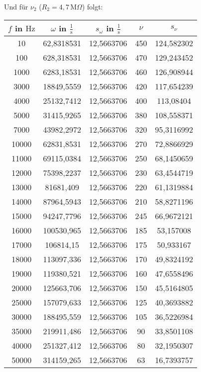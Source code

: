 Und für $\nu_2$ ($R_2=4,7\,\text{M}\Omega$) folgt:
\begin{table}[htbp]
    \centering
      \begin{tabular}{c||c|c|c|c}
      $f$ in $\text{Hz}$ & $\omega$ in $\frac{1}{\text{s}}$ & $s_\omega$ in $\frac{1}{\text{s}}$ & $\nu$ & $s_\nu$ \\
      \hline
      10 & 62,8318531 & 12,5663706 & 450 & 124,582302 \\
      100 & 628,318531 & 12,5663706 & 470 & 129,243452 \\
      1000 & 6283,18531 & 12,5663706 & 460 & 126,908944 \\
      3000 & 18849,5559 & 12,5663706 & 420 & 117,654239 \\
      4000 & 25132,7412 & 12,5663706 & 400 & 113,08404 \\
      5000 & 31415,9265 & 12,5663706 & 380 & 108,558371 \\
      7000 & 43982,2972 & 12,5663706 & 320 & 95,3116992 \\
      10000 & 62831,8531 & 12,5663706 & 270 & 72,8866929 \\
      11000 & 69115,0384 & 12,5663706 & 250 & 68,1450659 \\
      12000 & 75398,2237 & 12,5663706 & 230 & 63,4544719 \\
      13000 & 81681,409 & 12,5663706 & 220 & 61,1319884 \\
      14000 & 87964,5943 & 12,5663706 & 210 & 58,8271196 \\
      15000 & 94247,7796 & 12,5663706 & 245 & 66,9672121 \\
      16000 & 100530,965 & 12,5663706 & 185 & 53,157008 \\
      17000 & 106814,15 & 12,5663706 & 175 & 50,933167 \\
      18000 & 113097,336 & 12,5663706 & 170 & 49,8324192 \\
      19000 & 119380,521 & 12,5663706 & 160 & 47,6558496 \\
      20000 & 125663,706 & 12,5663706 & 150 & 45,5164805 \\
      25000 & 157079,633 & 12,5663706 & 125 & 40,3693882 \\
      30000 & 188495,559 & 12,5663706 & 105 & 36,5226984 \\
      35000 & 219911,486 & 12,5663706 & 90 & 33,8501108 \\
      40000 & 251327,412 & 12,5663706 & 80 & 32,1950307 \\
      50000 & 314159,265 & 12,5663706 & 63 & 16,7393757 \\

\end{tabular}
\end{table}
